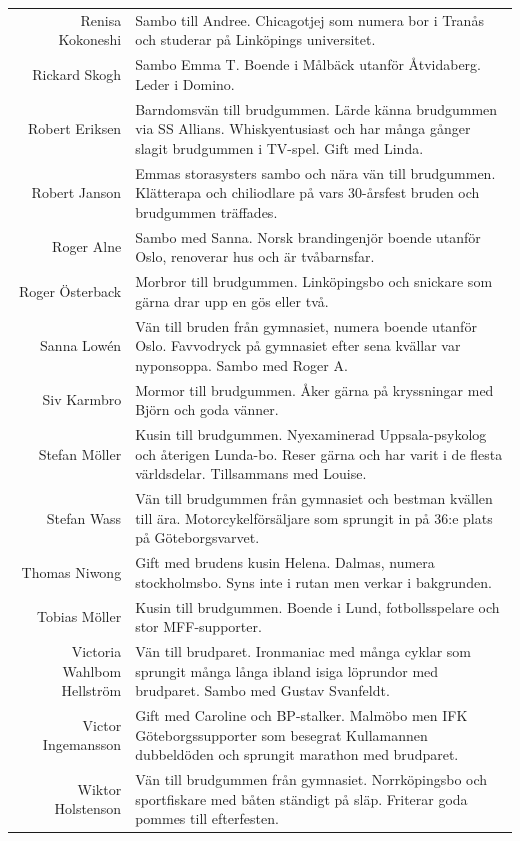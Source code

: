 \documentclass[a5paper]{article}
\begin{document}
\begin{longtable}[l]{N|L}
				Renisa Kokoneshi	&	Sambo till Andree. Chicagotjej som numera bor i Tranås och studerar på Linköpings universitet.	\\
				Rickard Skogh	&	Sambo Emma T. Boende i Målbäck utanför Åtvidaberg. Leder i Domino. \\
				Robert Eriksen	&	Barndomsvän till brudgummen. Lärde känna brudgummen via SS Allians. Whiskyentusiast och har många gånger slagit brudgummen i TV-spel. Gift med Linda. 	\\
				Robert Janson	&	Emmas storasysters sambo och nära vän till brudgummen. Klätterapa och chiliodlare på vars 30-årsfest bruden och brudgummen träffades.	\\
				Roger Alne	&	Sambo med Sanna. Norsk brandingenjör boende utanför Oslo, renoverar hus och är tvåbarnsfar.	\\
				Roger Österback	&	Morbror till brudgummen. Linköpingsbo och snickare som gärna drar upp en gös eller två.	\\
				Sanna Lowén	&	Vän till bruden från gymnasiet, numera boende utanför Oslo. Favvodryck på gymnasiet efter sena kvällar var nyponsoppa. Sambo med Roger A.	\\
				Siv Karmbro	&	Mormor till brudgummen. Åker gärna på kryssningar med Björn och goda vänner.	\\
				Stefan Möller	&	Kusin till brudgummen. Nyexaminerad Uppsala-psykolog och återigen Lunda-bo. Reser gärna och har varit i de flesta världsdelar. Tillsammans med Louise.	\\
				Stefan Wass	&	Vän till brudgummen från gymnasiet och bestman kvällen till ära. Motorcykelförsäljare som sprungit in på 36:e plats på Göteborgsvarvet.	\\
				Thomas Niwong	&	Gift med brudens kusin Helena. Dalmas, numera stockholmsbo. Syns inte i rutan men verkar i bakgrunden.	\\
				Tobias Möller	&	Kusin till brudgummen. Boende i Lund, fotbollsspelare och stor MFF-supporter.	\\
				Victoria Wahlbom Hellström	&	Vän till brudparet. Ironmaniac med många cyklar som sprungit många långa ibland isiga löprundor med brudparet. Sambo med Gustav Svanfeldt.	\\
				Victor Ingemansson	&	Gift med Caroline och BP-stalker. Malmöbo men IFK Göteborgssupporter som besegrat Kullamannen dubbeldöden och sprungit marathon med brudparet.	\\
				Wiktor Holstenson	&	Vän till brudgummen från gymnasiet. Norrköpingsbo och sportfiskare med båten ständigt på släp. Friterar goda pommes till efterfesten. 	\\
		\end{longtable}
	
\end{document}
